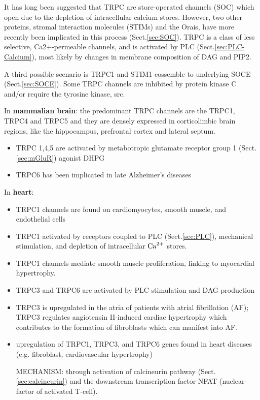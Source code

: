 It has long been suggested that TRPC are store-operated channels (SOC) which
open due to the depletion of intracellular calcium stores.
However, two other proteins, stromal interaction molecules (STIMs) and the
Orais, have more recently been implicated in this process (Sect.\ref{sec:SOC}).
TRPC is a class of less selective, Ca2+-permeable channels, and is activated by
PLC (Sect.\ref{sec:PLC-Calcium}), most likely by changes in membrane composition
of DAG and PIP2.

A third possible scenario is TRPC1 and STIM1 cossemble to underlying SOCE
(Sect.\ref{sec:SOCE}). Some TRPC channels are inhibited by protein kinase C
and/or require the tyrosine kinase, src. 

In {\bf mammalian brain}: the predominant TRPC channels are the TRPC1, TRPC4 and
TRPC5 and they are densely expressed in corticolimbic brain regions, like the
hippocampus, prefrontal cortex and lateral septum.
\begin{itemize}
  \item TRPC 1,4,5 are activated by metabotropic glutamate receptor group 1
  (Sect.\ref{sec:mGluR}) agonist DHPG

  \item TRPC6 has been implicated in late Alzheimer's diseases
\end{itemize}

In {\bf heart}:
\begin{itemize}
  \item TRPC1 channels are found on cardiomyocytes, smooth muscle, and
  endothelial cells
  
  \item TRPC1 activated by receptors coupled to PLC (Sect.\ref{sec:PLC}), 
  mechanical stimulation, and depletion of intracellular ${\text{Ca}^{2+}}$ stores.
  
  \item TRPC1 channels mediate smooth muscle proliferation, linking to
  myocardial hypertrophy.
  
  \item TRPC3 and TRPC6 are activated by PLC stimulation and DAG production


  
  \item TRPC3 is upregulated in the atria of patients with atrial fibrillation
  (AF); TRPC3 regulates angiotensin II-induced cardiac hypertrophy which
  contributes to the formation of fibroblasts which can manifest into AF.

  \item upregulation of TRPC1, TRPC3, and TRPC6 genes found in heart diseases
  (e.g. fibroblast, cardiovascular hypertrophy)
  
MECHANISM: through activation of calcineurin pathway
(Sect.\ref{sec:calcineurin}) and the downstream transcription factor NFAT
(nuclear-factor of activated T-cell).
\end{itemize}


